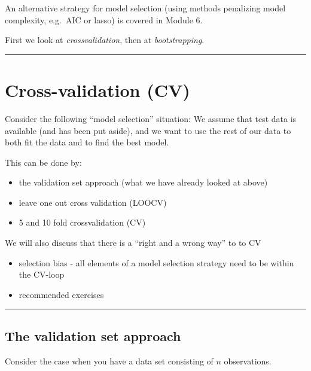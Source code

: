 \documentclass[]{article}
\providecommand{\tightlist}{%
  \setlength{\itemsep}{0pt}\setlength{\parskip}{0pt}}
\begin{document}
An alternative strategy for model selection (using methods penalizing
model complexity, e.g.~AIC or lasso) is covered in Module 6.

First we look at \emph{crossvalidation}, then at \emph{bootstrapping}.

\begin{center}\rule{0.5\linewidth}{\linethickness}\end{center}

\hypertarget{cross-validation-cv}{%
\section{Cross-validation (CV)}\label{cross-validation-cv}}

Consider the following ``model selection'' situation: We assume that
test data is available (and has been put aside), and we want to use the
rest of our data to both fit the data and to find the best model.

This can be done by:

\begin{itemize}
\tightlist
\item
  the validation set approach (what we have already looked at above)
\item
  leave one out cross validation (LOOCV)
\item
  5 and 10 fold crossvalidation (CV)
\end{itemize}

We will also discuss that there is a ``right and a wrong way'' to to CV

\begin{itemize}
\tightlist
\item
  selection bias - all elements of a model selection strategy need to be
  within the CV-loop
\item
  recommended exercises
\end{itemize}

\begin{center}\rule{0.5\linewidth}{\linethickness}\end{center}

\hypertarget{the-validation-set-approach}{%
\subsection{The validation set
approach}\label{the-validation-set-approach}}

Consider the case when you have a data set consisting of \(n\)
observations.
\end{document}
